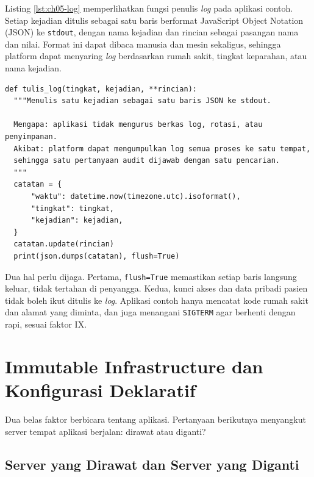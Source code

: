\begin{pendalaman}[title={Pendalaman Teknis (opsional): Log Terstruktur ke Stdout}]
  Listing \ref{lst:ch05-log} memperlihatkan fungsi penulis \textit{log} pada aplikasi
  contoh. Setiap kejadian ditulis sebagai satu baris berformat JavaScript Object Notation
  (JSON) ke \texttt{stdout}, dengan nama kejadian dan rincian sebagai pasangan nama dan
  nilai. Format ini dapat dibaca manusia dan mesin sekaligus, sehingga platform dapat
  menyaring \textit{log} berdasarkan rumah sakit, tingkat keparahan, atau nama kejadian.

\begin{lstlisting}[style=ch05python, caption={Menulis \textit{log} terstruktur ke \texttt{stdout}, tersedia di \berkas{sources/chapter05/contoh-aplikasi-konfigurasi/app.py}}, label={lst:ch05-log}]
def tulis_log(tingkat, kejadian, **rincian):
  """Menulis satu kejadian sebagai satu baris JSON ke stdout.

  Mengapa: aplikasi tidak mengurus berkas log, rotasi, atau penyimpanan.
  Akibat: platform dapat mengumpulkan log semua proses ke satu tempat,
  sehingga satu pertanyaan audit dijawab dengan satu pencarian.
  """
  catatan = {
      "waktu": datetime.now(timezone.utc).isoformat(),
      "tingkat": tingkat,
      "kejadian": kejadian,
  }
  catatan.update(rincian)
  print(json.dumps(catatan), flush=True)
\end{lstlisting}

  Dua hal perlu dijaga. Pertama, \texttt{flush=True} memastikan setiap baris langsung
  keluar, tidak tertahan di penyangga. Kedua, kunci akses dan data pribadi pasien tidak
  boleh ikut ditulis ke \textit{log}. Aplikasi contoh hanya mencatat kode rumah sakit dan
  alamat yang diminta, dan juga menangani \texttt{SIGTERM} agar berhenti dengan rapi,
  sesuai faktor IX.
\end{pendalaman}

\section{Immutable Infrastructure dan Konfigurasi Deklaratif}
\label{sec:ch05-immutable}

Dua belas faktor berbicara tentang aplikasi. Pertanyaan berikutnya menyangkut server tempat
aplikasi berjalan: dirawat atau diganti?

\subsection{Server yang Dirawat dan Server yang Diganti}

